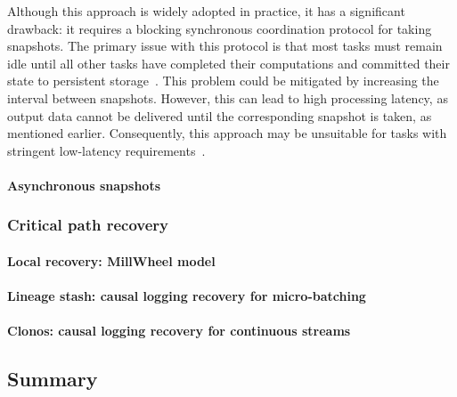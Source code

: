 Although this approach is widely adopted in practice, it has a significant drawback: it requires a blocking synchronous coordination protocol for taking snapshots. The primary issue with this protocol is that most tasks must remain idle until all other tasks have completed their computations and committed their state to persistent storage~\cite{carbone2018scalable, thepaper}. This problem could be mitigated by increasing the interval between snapshots. However, this can lead to high processing latency, as output data cannot be delivered until the corresponding snapshot is taken, as mentioned earlier. Consequently, this approach may be unsuitable for tasks with stringent low-latency requirements~\cite{carbone2018scalable}.

\paragraph{Asynchronous snapshots}

\subsubsection{Critical path recovery}
\label{phd-related-critical-path-recovery}

\paragraph{Local recovery: MillWheel model}

\paragraph{Lineage stash: causal logging recovery for micro-batching}

\paragraph{Clonos: causal logging recovery for continuous streams}

\subsection{Summary}
\label{review_summary}